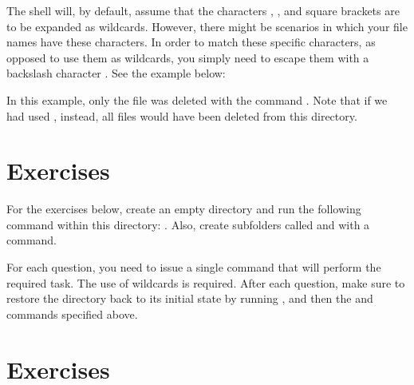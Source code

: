 The shell will, by default, assume that the characters \mycommand{*}, , and square brackets \mycommand{{[}{]}} are to be expanded as wildcards. However, there might be scenarios in which your file names have these characters. In order to match these specific characters, as opposed to use them as wildcards, you simply need to escape them with a backslash character \mycommand{\textbackslash}. See the example below:
In this example, only the file  was deleted with the command . Note that if we had used , instead, all files would have been deleted from this directory.

\section*{Exercises}

For the exercises below, create an empty directory and run the following command within this directory:              . Also, create subfolders called  and  with a  command.

For each question, you need to issue a single command that will perform the required task. The use of wildcards is required. After each question, make sure to restore the directory back to its initial state by running , and then the  and  commands specified above.

\section*{Exercises}

